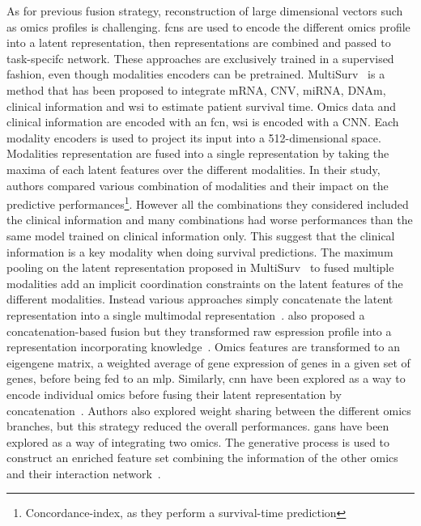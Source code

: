 \documentclass[../main.tex]{subfiles}
\begin{document}
	    As for previous fusion strategy, reconstruction of large dimensional vectors such as omics profiles is challenging.
	    \Glspl{fcn} are used to encode the different omics profile into a latent representation, then representations are combined and passed to task-specifc network.
	    These approaches are exclusively trained in a supervised fashion, even though modalities encoders can be pretrained.
	    MultiSurv~\cite{MultiSurv} is a method that has been proposed to integrate mRNA, CNV, miRNA, DNAm, clinical information and \gls{wsi} to estimate patient survival time.
	    Omics data and clinical information are encoded with an \gls{fcn}, \gls{wsi} is encoded with a CNN.
	    Each modality encoders is used to project its input into a 512-dimensional space.
	    Modalities representation are fused into a single representation by taking the maxima of each latent features over the different modalities.
	    In their study, authors compared various combination of modalities and their impact on the predictive performances\footnote{Concordance-index, as they perform a survival-time prediction}.
	    However all the combinations they considered included the clinical information and many combinations had worse performances than the same model trained on clinical information only.
	    This suggest that the clinical information is a key modality when doing survival predictions.
	    The maximum pooling on the latent representation proposed in MultiSurv~\cite{MultiSurv} to fused multiple modalities add an implicit coordination constraints on the latent features of the different modalities.
	    Instead various approaches simply concatenate the latent representation into a single multimodal representation~\cite{MOLI,Lin2020}.
	    \citeauthor{SALMON} also proposed a concatenation-based fusion but they transformed raw espression profile into a representation incorporating knowledge~\cite{SALMON}.
	    Omics features are transformed to an eigengene matrix, a weighted average of gene expression of genes in a given set of genes, before being fed to an \gls{mlp}.
	    Similarly, \gls{cnn} have been explored as a way to encode individual omics before fusing their latent representation by concatenation~\cite{MohaiminulIslam2020}.
	    Authors also explored weight sharing between the different omics branches, but this strategy reduced the overall performances.
	    \Glspl{gan} have been explored as a way of integrating two omics.
	    The generative process is used to construct an enriched feature set combining the information of the other omics and their interaction network~\cite{omicsGAN}.
\end{document}
